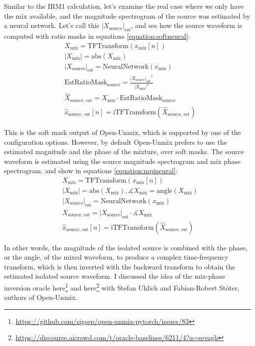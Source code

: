 \documentclass[report.tex]{subfiles}
\begin{document}
Similar to the IRM1 calculation, let's examine the real case where we only have the mix available, and the magnitude spectrogram of the source was estimated by a neural network. Let's call this $|X_{\text{source}}|_{\text{est}}$, and see how the source waveform is computed with ratio masks in equations \ref{equation:softneural}:
\begin{align}\tag{2}\label{equation:softneural}
	\nonumber & X_{\text{mix}} = \text{TFTransform}(x_{\text{mix}}[n])\\
	\nonumber & |X_{\text{mix}}| = \text{abs}(X_{\text{mix}})\\
	\nonumber & {|X_{\text{source}}|}_{\text{est}} = \text{NeuralNetwork}(x_{\text{mix}})\\
	\nonumber & \text{EstRatioMask}_{\text{source}} = \frac{{|X_{\text{source}}|_{\text{est}}}^{1}}{|X_{\text{mix}}|^{1}}\\
	\nonumber & \hat{X}_{\text{source, est}} = X_{\text{mix}} \cdot \text{EstRatioMask}_{\text{source}}\\
	\nonumber & \hat{x}_{\text{source, est}}[n] = \text{iTFTransform}(\hat{X}_{\text{source, est}})
\end{align}

This is the soft mask output of Open-Unmix, which is supported by one of the configuration options. However, by default Open-Unmix prefers to use the estimated magnitude and the phase of the mixture, over soft masks. The source waveform is estimated using the source magnitude spectrogram and mix phase spectrogram, and show in equations \ref{equation:mpineural}:
\begin{align}\tag{3}\label{equation:mpineural}
	\nonumber & X_{\text{mix}} = \text{TFTransform}(x_{\text{mix}}[n])\\
	\nonumber & |X_{\text{mix}}| = \text{abs}(X_{\text{mix}}), \measuredangle{X_{\text{mix}}} = \text{angle}(X_{\text{mix}})\\
	\nonumber & {|X_{\text{source}}|}_{\text{est}} = \text{NeuralNetwork}(x_{\text{mix}})\\
	\nonumber & X_{\text{source, est}} = {|X_{\text{source}}|}_{\text{est}} \cdot \measuredangle{X_{\text{mix}}}\\
	\nonumber & \hat{x}_{\text{source, est}}[n] = \text{iTFTransform}(\hat{X}_{\text{source, est}})
\end{align}

In other words, the magnitude of the isolated source is combined with the phase, or the angle, of the mixed waveform, to produce a complex time-frequency transform, which is then inverted with the backward transform to obtain the estimated isolated source waveform. I discussed the idea of the mix-phase inversion oracle here\footnote{\url{https://github.com/sigsep/open-unmix-pytorch/issues/83}} and here\footnote{\url{https://discourse.aicrowd.com/t/oracle-baselines/6211/4?u=sevagh}} with Stefan Uhlich and Fabian-Robert St{\"o}ter, authors of Open-Unmix.
\end{document}
